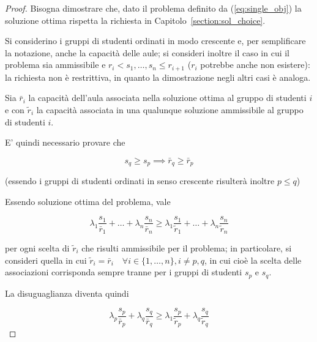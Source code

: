 \begin{proof}
    Bisogna dimostrare che, dato il problema definito da (\ref{eq:single_obj})
    la soluzione ottima rispetta la richiesta in Capitolo~\ref{section:sol_choice}.
    
    Si considerino i gruppi di studenti ordinati in modo crescente e, per 
    semplificare la notazione, anche la capacità delle aule;
    si consideri inoltre il caso in cui il problema sia ammissibile e $r_i < s_1, \dots, s_n \leq r_{i+1}$ ($r_i$ potrebbe 
    anche non esistere): la richiesta non è restrittiva, in quanto la dimostrazione negli 
    altri casi è analoga.

    Sia $\bar{r}_i$ la capacità dell'aula associata nella soluzione 
    ottima al gruppo di studenti $i$ e con $\tilde{r}_i$ la capacità associata in una 
    qualunque soluzione ammissibile al gruppo di studenti $i$.

    E' quindi necessario provare che 
    
    \begin{equation}
        s_q \geq s_p \implies \bar{r}_q \geq \bar{r}_p    
        \label{eq:}
    \end{equation}

    \noindent
    (essendo i gruppi di studenti ordinati in senso crescente risulterà inoltre $p \leq q$)
    
    Essendo soluzione ottima del problema, vale
    
    \begin{equation*}
        \lambda_1 \frac{s_1}{\bar{r}_1} + \dots + \lambda_{n} \frac{s_{n}}{\bar{r}_{n}} \geq
        \lambda_1 \frac{s_1}{\tilde{r}_1} + \dots + \lambda_{n} \frac{s_{n}}{\tilde{r}_{n}}
        \label{eq:}
    \end{equation*}
    
    \noindent
    per ogni scelta di $\tilde{r}_i$ che risulti ammissibile per il problema; in particolare, 
    si consideri quella in cui $\tilde{r}_i = \bar{r}_i \quad \forall i \in \{1, \dots, n\}, i \neq p, q$,
    in cui cioè la scelta delle associazioni corrisponda sempre tranne per i gruppi di studenti 
    $s_p$ e $s_q$.
    
    La disuguaglianza diventa quindi
    
    \begin{equation*}
        \lambda_p \frac{s_p}{\bar{r}_p} + \lambda_{q} \frac{s_{q}}{\bar{r}_{q}} \geq
        \lambda_1 \frac{s_p}{\tilde{r}_p} + \lambda_{q} \frac{s_{q}}{\tilde{r}_{q}}
        \label{eq:}
    \end{equation*}
    

\end{proof}
